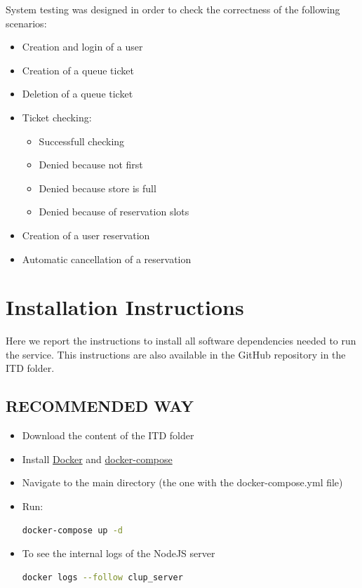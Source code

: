 \documentclass[
]{article}
\begin{document}
System testing was designed in order to check the correctness of the following scenarios:
\begin{itemize}
  \item Creation and login of a user
  \item Creation of a queue ticket
  \item Deletion of a queue ticket
  \item Ticket checking:
  \begin{itemize}
    \item Successfull checking
    \item Denied because not first
    \item Denied because store is full
    \item Denied because of reservation slots
  \end{itemize}
  \item Creation of a user reservation
  \item Automatic cancellation of a reservation
\end{itemize}

\hypertarget{installation-instructions}{%
\section{Installation Instructions}\label{installation-instructions}}

Here we report the instructions to install all software dependencies
needed to run the service. This instructions are also available in the
GitHub repository in the ITD folder.

\subsection{RECOMMENDED WAY}\label{recommended-install}
\begin{itemize}
  \item Download the content of the ITD folder
  \item Install \href{https://docs.docker.com/get-docker/}{Docker} and \href{https://docs.docker.com/compose/install/}{docker-compose}
  \item Navigate to the main directory (the one with the docker-compose.yml file)
  \item Run: 
  \begin{lstlisting}[language=bash]
    docker-compose up -d
  \end{lstlisting}
  \item To see the internal logs of the NodeJS server
  \begin{lstlisting}[language=bash]
    docker logs --follow clup_server 
  \end{lstlisting}
\end{itemize}
\end{document}
